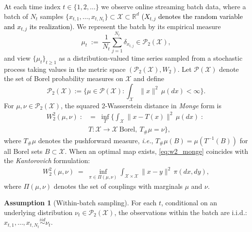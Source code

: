 \documentclass{article}
\newcommand{\ie}{\textit{i.e.}, \xspace}
\newcommand{\rev}[1]{\textcolor{black}{#1}}
\theoremstyle{plain}
\theoremstyle{definition}
\newtheorem{assumption}[theorem]{Assumption}
\theoremstyle{remark}
\begin{document}

At each time index $t\in\{1,2,\dots\}$ we observe online streaming batch data, where a batch of $N_t$ samples
$\{x_{t,1},\dots,x_{t,N_t}\}\subset\mathcal{X}\subset\mathbb{R}^d$ \rev{($X_{t,j}$ denotes the random variable and  $x_{t,j}$ its realization)}.
We represent the batch by its empirical measure
\[
\mu_t \;:=\; \frac{1}{N_t}\sum_{j=1}^{N_t}\delta_{x_{t,j}} \in \mathcal{P}_2(\mathcal{X}),
\]
and view $\{\mu_t\}_{t\ge 1}$ as a distribution-valued time series sampled from a stochastic process taking values in the metric space $(\mathcal{P}_2(\mathcal{X}),W_2)$.
Let $\mathcal{P}(\mathcal{X})$ denote the set of Borel probability measures on $\mathcal{X}$ and define
\[
\mathcal{P}_2(\mathcal{X})
:= \Big\{\mu\in\mathcal{P}(\mathcal{X}) : \int_{\mathcal{X}}\|x\|^2\,\mu(dx) < \infty\Big\}.
\]
For $\mu,\nu\in\mathcal{P}_2(\mathcal{X})$, the squared 2-Wasserstein distance in \emph{Monge} form is
\begin{align}
W_2^2(\mu,\nu)
\;: & =\;
\inf_{T}\Big\{\int_{\mathcal{X}}\|x-T(x)\|^2\,\mu(dx)\;:\; \nonumber \\
& T:\mathcal{X}\to\mathcal{X}\ \text{Borel},\ T_{\#}\mu=\nu\Big\},
\label{eq:w2_monge}
\end{align}
where $T_{\#}\mu$ denotes the pushforward measure, \ie
$T_{\#}\mu(B)=\mu(T^{-1}(B))$ for all Borel sets $B\subset\mathcal{X}$.
When an optimal map exists, \cref{eq:w2_monge} coincides with the \emph{Kantorovich} formulation:
\begin{align}
W_2^2(\mu,\nu)
\;=\;
\inf_{\pi\in\Pi(\mu,\nu)} \int_{\mathcal{X}\times\mathcal{X}} \|x-y\|^2\,\pi(dx,dy),
\label{eq:w2_kant}
\end{align}
where $\Pi(\mu,\nu)$ denotes the set of couplings with marginals $\mu$ and $\nu$.


\begin{assumption}[Within-batch sampling]\label{assump:within_batch}
For each $t$, conditional on an underlying distribution $\nu_t\in\mathcal{P}_2(\mathcal{X})$,
the observations within the batch are i.i.d.:
$x_{t,1},\dots,x_{t,N_t}\stackrel{iid}{\sim}\nu_t$.
\end{assumption}
\end{document}
